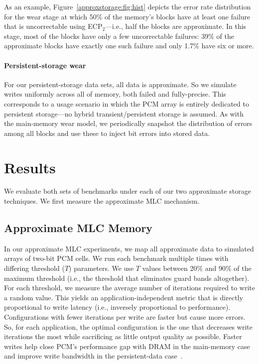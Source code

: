 As an example, Figure~\ref{approxstorage:fig:hist} depicts the error rate distribution for the
wear stage at which 50\% of the memory's blocks have at least one failure that
is uncorrectable using ECP$_2$---i.e.,
half the blocks are approximate. In this stage,
most of the blocks have only a few uncorrectable failures: 39\% of the
approximate blocks have exactly one such failure and only 1.7\% have
six or more.



\paragraph{Persistent-storage wear} For our persistent-storage data sets, all
data is approximate. So we simulate writes uniformly across all of
memory, both failed and fully-precise. This corresponds to a usage scenario in
which the PCM array is entirely dedicated to persistent storage---no hybrid
transient/persistent storage is assumed. As with the main-memory wear model, we
periodically snapshot the distribution of errors among all blocks and use these
to inject bit errors into stored data.


\section{Results}
\label{approxstorage:sec:results}

We evaluate both sets of benchmarks under each of our two approximate storage
techniques.
We first measure the approximate MLC mechanism.

\subsection{Approximate MLC Memory}

In our approximate MLC experiments, we map all approximate data to simulated
arrays of two-bit PCM cells. We run each benchmark multiple times with
differing threshold ($T$) parameters. We use $T$ values between 20\%
and 90\% of the maximum threshold (i.e., the threshold that eliminates
guard bands altogether).
For each threshold, we measure the
average number of iterations required to write a random value.
This yields an application-independent metric that is
directly proportional to write latency (i.e., inversely
proportional to performance). Configurations with fewer iterations per write
are faster but cause more errors. So, for each application, the optimal
configuration is the one that decreases write iterations the most while
sacrificing as little output quality as possible.
Faster writes help close PCM's performance gap with DRAM in the main-memory
case and improve write bandwidth in the persistent-data
case~\cite{pcm-dram-alt,flash-retention-relax}.

